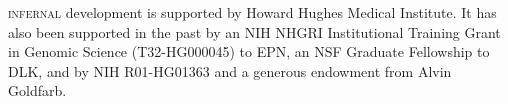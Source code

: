 \textsc{infernal} development is supported by Howard Hughes Medical
Institute. It has also been supported in the past by an NIH NHGRI
Institutional Training Grant in Genomic Science (T32-HG000045) to EPN,
an NSF Graduate Fellowship to DLK, and by NIH R01-HG01363 and a
generous endowment from Alvin Goldfarb. 
